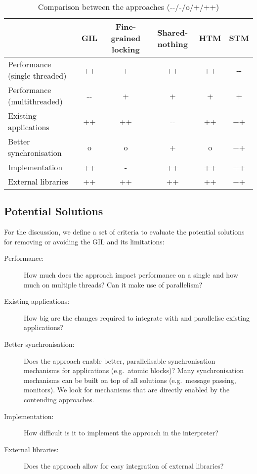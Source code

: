 \documentclass{sigplanconf}
\begin{document}
\begin{table*}[ht]
  \centering
  \begin{tabular}{|l|c|c|c|c|c|}
    \hline
    & \textbf{GIL} & \textbf{Fine-grained locking}
    & \textbf{Shared-nothing} & \textbf{HTM} & \textbf{STM}\\
    \hline
    Performance (single threaded) & ++   & +  & ++   & ++ & -{-} \\
    \hline
    Performance (multithreaded)   & -{-} & +  & +    & +  & +    \\
    \hline
    Existing applications         & ++   & ++ & -{-} & ++ & ++   \\
    \hline
    Better synchronisation        & o    & o  & +    & o  & ++   \\
    \hline
    Implementation                & ++   & -  & ++   & ++ & ++   \\
    \hline
    External libraries            & ++   & ++ & ++   & ++ & ++   \\
    \hline
  \end{tabular}
  \caption{Comparison between the approaches (-{-}/-/o/+/++)}
  \label{tab:comparison}
\end{table*}



\subsection{Potential Solutions}
\label{sec:pot_solutions}

For the discussion, we define a set of criteria to evaluate the
potential solutions for removing or avoiding the GIL and its
limitations:

\begin{description}
\item[Performance:] How much does the approach impact performance on a single
  and how much on multiple threads? Can it make use of parallelism?
\item[Existing applications:] How big are the changes required to
  integrate with and parallelise existing applications?
\item[Better synchronisation:] Does the approach enable better,
  parallelisable synchronisation mechanisms for applications
  (e.g.\ atomic blocks)?  Many synchronisation mechanisms can be built on
  top of all solutions (e.g.\  message passing, monitors). We look for mechanisms
  that are directly enabled by the contending approaches.
\item[Implementation:] How difficult is it to implement the approach
  in the interpreter?
\item[External libraries:] Does the approach allow for easy
  integration of external libraries?
\end{description}
\end{document}
